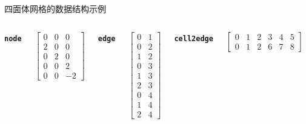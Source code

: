 \documentclass[aspectratio=169,professionalfonts]{ctexbeamer}
\begin{document}
\begin{frame}{四面体网格的数据结构示例}
\begin{columns}[c,onlytextwidth]
{\begin{minipage}[t]{0.22\linewidth}
\begin{minipage}[t][3.75cm][t]{\linewidth}
\centering
{\normalsize\bfseries\texttt{node}}

$$
\begin{bmatrix}
0&0&0\\
2&0&0\\
0&2&0\\
0&0&2\\
0&0&-2
\end{bmatrix}
$$
\end{minipage}

\end{minipage}
\hfill
\begin{minipage}[t]{0.23\linewidth}
\vspace{0pt}
\centering

\begin{minipage}[t][3.75cm][t]{\linewidth}
\centering
{\normalsize\bfseries\texttt{edge}}

$$
\begin{bmatrix}
0&1\\
0&2\\
1&2\\
0&3\\
1&3\\
2&3\\
0&4\\
1&4\\
2&4
\end{bmatrix}
$$
\end{minipage}

\iffalse

\vspace{0.5em}

{\normalsize\bfseries\texttt{cell2edge}}

$$
\begin{bmatrix}
0&1&2&3&4&5\\
0&1&2&6&7&8
\end{bmatrix}
$$


\end{minipage}}
\end{columns}
\end{frame}
\end{document}
